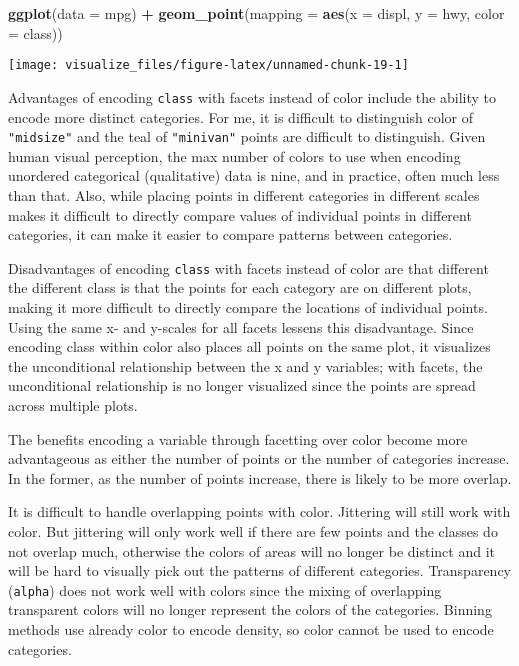 \documentclass[]{book}
\newenvironment{Shaded}{\begin{snugshade}}{\end{snugshade}}
\newcommand{\DataTypeTok}[1]{\textcolor[rgb]{0.13,0.29,0.53}{#1}}
\newcommand{\KeywordTok}[1]{\textcolor[rgb]{0.13,0.29,0.53}{\textbf{#1}}}
\newcommand{\NormalTok}[1]{#1}
\newcommand{\OperatorTok}[1]{\textcolor[rgb]{0.81,0.36,0.00}{\textbf{#1}}}
\newcommand{\StringTok}[1]{\textcolor[rgb]{0.31,0.60,0.02}{#1}}
\theoremstyle{plain}
\theoremstyle{remark}
\begin{document}
\begin{Shaded}
\begin{Highlighting}[]
\KeywordTok{ggplot}\NormalTok{(}\DataTypeTok{data =}\NormalTok{ mpg) }\OperatorTok{+}
\StringTok{  }\KeywordTok{geom_point}\NormalTok{(}\DataTypeTok{mapping =} \KeywordTok{aes}\NormalTok{(}\DataTypeTok{x =}\NormalTok{ displ, }\DataTypeTok{y =}\NormalTok{ hwy, }\DataTypeTok{color =}\NormalTok{ class))}
\end{Highlighting}
\end{Shaded}

\begin{center}\texttt{[image: visualize\_files/figure-latex/unnamed-chunk-19-1]} \end{center}

Advantages of encoding \texttt{class} with facets instead of color
include the ability to encode more distinct categories. For me, it is
difficult to distinguish color of \texttt{"midsize"} and the teal of
\texttt{"minivan"} points are difficult to distinguish. Given human
visual perception, the max number of colors to use when encoding
unordered categorical (qualitative) data is nine, and in practice, often
much less than that. Also, while placing points in different categories
in different scales makes it difficult to directly compare values of
individual points in different categories, it can make it easier to
compare patterns between categories.

Disadvantages of encoding \texttt{class} with facets instead of color
are that different the different class is that the points for each
category are on different plots, making it more difficult to directly
compare the locations of individual points. Using the same x- and
y-scales for all facets lessens this disadvantage. Since encoding class
within color also places all points on the same plot, it visualizes the
unconditional relationship between the x and y variables; with facets,
the unconditional relationship is no longer visualized since the points
are spread across multiple plots.

The benefits encoding a variable through facetting over color become
more advantageous as either the number of points or the number of
categories increase. In the former, as the number of points increase,
there is likely to be more overlap.

It is difficult to handle overlapping points with color. Jittering will
still work with color. But jittering will only work well if there are
few points and the classes do not overlap much, otherwise the colors of
areas will no longer be distinct and it will be hard to visually pick
out the patterns of different categories. Transparency (\texttt{alpha})
does not work well with colors since the mixing of overlapping
transparent colors will no longer represent the colors of the
categories. Binning methods use already color to encode density, so
color cannot be used to encode categories.
\end{document}
